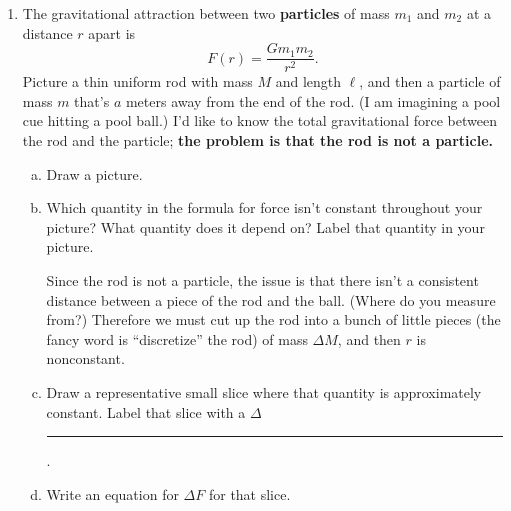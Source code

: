 \documentclass[12pt]{article}
\newenvironment{red}{\color{red}}{\ignorespacesafterend}
\begin{document}
\begin{enumerate}
\begin{enumerate}[(a)]
    \begin{red}
        Either integral gives the same value: the mass of the atmosphere out to the Kármán line is $\qty{5.162e18}{kg}$.
    \end{red}
    \item Describe the meaning of each factor of your integral, and give its units.
    \begin{red}
        \[\int_{r=6300000}^{6383800} 
    \underbrace{ 
        \underbrace{ 1.28 e^{-0.000124(r-6300000)} }_
            { \stackrel{ \text{Density of the earth's atmosphere}}
                       { \text{at altitude $r$ (kg/m\(^2\))   }\quad } } 
        \underbrace{ 4\pi r^2\ dr }_
            { \stackrel{ \text{Volume of a thin shell of the earth's} }
                       { \text{atmosphere at altitude $r$ (m\(^3\))} } } }
    _{ \text{Mass of a spherical shell with thickness \(dr\) of the earth's atmosphere 
            at altitude $r$ (kg)} }\]
    \end{red}
\end{enumerate}

\item The gravitational attraction between two \textbf{particles} of mass \(m_1\) and \(m_2\) at a distance \(r\) apart is
\[F(r) = \frac{Gm_1 m_2}{r^2}.\]
Picture a thin uniform rod with mass \(M\) and length \(\ell\), and then a particle of mass \(m\) that's \(a\) meters away from the end of the rod. (I am imagining a pool cue hitting a pool ball.) I'd like to know the total gravitational force between the rod and the particle; \textbf{the problem is that the rod is not a particle.}
\begin{enumerate}[(a)]
    \item Draw a picture.
    \item Which quantity in the formula for force isn't constant throughout your picture? What quantity does it depend on? Label that quantity in your picture.

    \begin{red}
        Since the rod is not a particle, the issue is that there isn't a consistent distance between a piece of the rod and the ball. (Where do you measure from?) Therefore we must cut up the rod into a bunch of little pieces (the fancy word is ``discretize'' the rod) of mass $\Delta M$, and then $r$ is nonconstant.
    \end{red}
    \item Draw a representative small slice where that quantity is approximately constant. Label that slice with a \(\Delta\)\rule{0.5cm}{0.15mm}.
    \item Write an equation for \(\Delta F\) for that slice.


\end{enumerate}
\end{enumerate}
\end{document}
